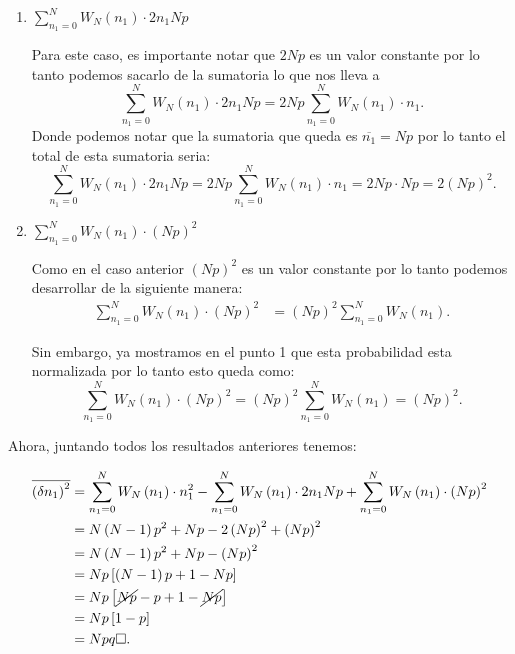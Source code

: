 \documentclass{report}
\begin{document}
\begin{enumerate}
  \item $\displaystyle\sum_{n_1 = 0}^{N} W_N\left( n_1 \right)\cdot  2n_1Np$
    
    Para este caso, es importante notar que $2Np$ es un valor constante por lo tanto podemos sacarlo de la sumatoria lo que nos lleva a \[
    \sum_{n_1 = 0}^{N} W_N\left( n_1 \right)\cdot  2n_1Np = 2Np \sum_{n_1 = 0}^{N} W_N\left( n_1 \right)\cdot  n_1
    .\] Donde podemos notar que la sumatoria que queda es $\overline{n_1} = Np$ por lo tanto el total de esta sumatoria seria: \[
    \sum_{n_1 = 0}^{N} W_N\left( n_1 \right)\cdot  2n_1Np = 2Np \sum_{n_1 = 0}^{N} W_N\left( n_1 \right)\cdot  n_1 = 2Np\cdot Np = 2\left( Np \right)^2
    .\] 
  \item $\displaystyle\sum_{n_1 = 0}^{N} W_N\left( n_1 \right) \cdot \left( Np \right)^2$

    Como en el caso anterior  $\left( Np \right)^2$ es un valor constante por lo tanto podemos desarrollar de la siguiente manera:
    \begin{align*}
      \sum_{n_1 = 0}^{N} W_N\left( n_1 \right) \cdot \left( Np \right)^2 &= \left( Np \right)^2 \sum_{n_1 = 0}^{N} W_N\left( n_1 \right)
    .\end{align*}

    Sin embargo, ya mostramos en el punto 1 que esta probabilidad esta normalizada por lo tanto esto queda como: \[
      \sum_{n_1 = 0}^{N} W_N\left( n_1 \right) \cdot \left( Np \right)^2 = \left( Np \right)^2 \sum_{n_1 = 0}^{N} W_N\left( n_1 \right) = \left( Np \right)^2
    .\] 
\end{enumerate}

Ahora, juntando todos los resultados anteriores tenemos:

\begin{align*}
  \overline{\left( \delta n_1 \right)^2 } &= \sum_{n_1 = 0}^{N} W_N\left( n_1 \right) \cdot n_1^2 -\sum_{n_1 = 0}^{N} W_N\left( n_1 \right)\cdot  2n_1Np +\sum_{n_1 = 0}^{N} W_N\left( n_1 \right) \cdot \left( Np \right)^2 \\
  &= N\left( N - 1 \right)p^2 + Np - 2\left( Np \right)^2 + \left( Np \right)^2 \\
  &= N\left( N - 1 \right) p^2 + Np - \left( Np \right)^2 \\
  &= Np\left[ \left( N - 1 \right)p + 1 - Np \right]  \\
  &= Np\left[ \cancel{Np} - p + 1 - \cancel{Np} \right]  \\
  &= Np\left[ 1 - p \right]  \\
  &= Npq \square
.\end{align*}
\end{document}
